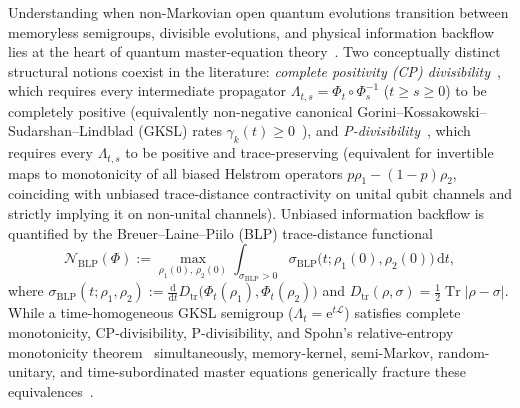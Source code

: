 \documentclass[twocolumn,10pt,amsmath,amssymb,floatfix]{revtex4-2}
\theoremstyle{plain}
\theoremstyle{definition}
\newcommand{\dd}{\mathrm{d}}
\newcommand{\ee}{\mathrm{e}}
\newcommand{\Tr}{\operatorname{Tr}}
\newcommand{\NBLP}{\mathcal{N}_{\mathrm{BLP}}}
\begin{document}
Understanding when non-Markovian open quantum evolutions transition between memoryless semigroups, divisible evolutions, and physical information backflow lies at the heart of quantum master-equation theory~\cite{Breuer2009PRL,Laine2010PRA,Rivas2010PRL,Chruscinski2011PRA,Rivas2014RPP,Breuer2016RMP}. Two conceptually distinct structural notions coexist in the literature: \emph{complete positivity (CP) divisibility}~\cite{Rivas2010PRL,Hall2014PRA,Chruscinski2014PRL,Filippov2017PRA}, which requires every intermediate propagator $\Lambda_{t,s} = \Phi_t \circ \Phi_s^{-1}$ ($t \ge s \ge 0$) to be completely positive (equivalently non-negative canonical Gorini--Kossakowski--Sudarshan--Lindblad (GKSL) rates $\gamma_k(t) \ge 0$~\cite{Lindblad1976,Gorini1976JMP}), and \emph{P-divisibility}~\cite{Chruscinski2014PRL,Wissmann2015PRA,Bae2016PRL}, which requires every $\Lambda_{t,s}$ to be positive and trace-preserving (equivalent for invertible maps to monotonicity of all biased Helstrom operators $p\rho_1 - (1-p)\rho_2$, coinciding with unbiased trace-distance contractivity on unital qubit channels and strictly implying it on non-unital channels). Unbiased information backflow is quantified by the Breuer--Laine--Piilo (BLP) trace-distance functional~\cite{Breuer2009PRL,Laine2010PRA}
\begin{equation}
\NBLP(\Phi) := \max_{\rho_1(0),\,\rho_2(0)} \int_{\sigma_{\mathrm{BLP}}>0} \sigma_{\mathrm{BLP}}\big(t;\rho_1(0),\rho_2(0)\big)\,\dd t,
\end{equation}
where $\sigma_{\mathrm{BLP}}(t;\rho_1,\rho_2) := \frac{\dd}{\dd t} D_{\mathrm{tr}}\big(\Phi_t(\rho_1),\Phi_t(\rho_2)\big)$ and $D_{\mathrm{tr}}(\rho,\sigma) = \frac{1}{2}\Tr|\rho - \sigma|$. While a time-homogeneous GKSL semigroup ($\Lambda_t = \ee^{t\mathcal{L}}$) satisfies complete monotonicity, CP-divisibility, P-divisibility, and Spohn's relative-entropy monotonicity theorem~\cite{Spohn1978JMP} simultaneously, memory-kernel, semi-Markov, random-unitary, and time-subordinated master equations generically fracture these equivalences~\cite{Budini2004PRA,Daffer2004PRA,Shabani2005PRA,Breuer2008PRL,Breuer2009PRE,Vacchini2013PRA,Addis2014PRA,Hall2014PRA,Chruscinski2015PRA,Chruscinski2016PRA,Vacchini2016PRL,Megier2017SciRep,Filippov2017PRA}.
\end{document}

